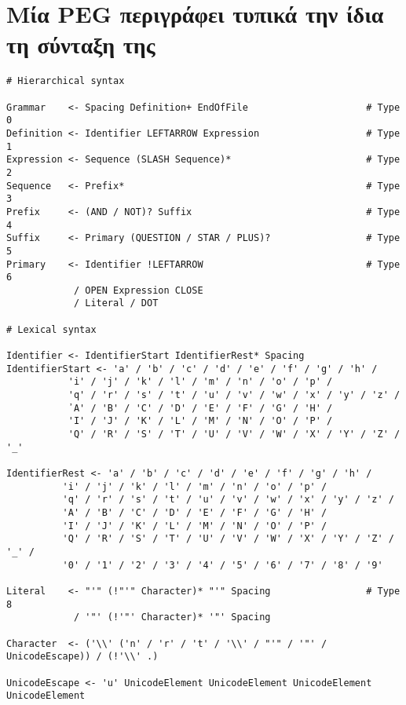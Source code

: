 \documentclass[diploma]{softlab-thesis}
\begin{document}

\backmatter

\appendix

\chapter{Μία PEG περιγράφει τυπικά την ίδια τη σύνταξη της}

\begin{Verbatim}
# Hierarchical syntax

Grammar    <- Spacing Definition+ EndOfFile                     # Type 0
Definition <- Identifier LEFTARROW Expression                   # Type 1
Expression <- Sequence (SLASH Sequence)*                        # Type 2
Sequence   <- Prefix*                                           # Type 3
Prefix     <- (AND / NOT)? Suffix                               # Type 4
Suffix     <- Primary (QUESTION / STAR / PLUS)?                 # Type 5
Primary    <- Identifier !LEFTARROW                             # Type 6
            / OPEN Expression CLOSE
            / Literal / DOT

# Lexical syntax

Identifier <- IdentifierStart IdentifierRest* Spacing
IdentifierStart <- 'a' / 'b' / 'c' / 'd' / 'e' / 'f' / 'g' / 'h' / 
		   'i' / 'j' / 'k' / 'l' / 'm' / 'n' / 'o' / 'p' / 
		   'q' / 'r' / 's' / 't' / 'u' / 'v' / 'w' / 'x' / 'y' / 'z' / 
		   ᾽A' / 'B' / 'C' / 'D' / 'E' / 'F' / 'G' / 'H' / 
		   'I' / 'J' / 'K' / 'L' / 'M' / 'N' / 'O' / 'P' / 
		   'Q' / 'R' / 'S' / 'T' / 'U' / 'V' / 'W' / 'X' / 'Y' / 'Z' / '_'

IdentifierRest <- 'a' / 'b' / 'c' / 'd' / 'e' / 'f' / 'g' / 'h' / 
		  'i' / 'j' / 'k' / 'l' / 'm' / 'n' / 'o' / 'p' / 
		  'q' / 'r' / 's' / 't' / 'u' / 'v' / 'w' / 'x' / 'y' / 'z' / 
		  'A' / 'B' / 'C' / 'D' / 'E' / 'F' / 'G' / 'H' / 
		  'I' / 'J' / 'K' / 'L' / 'M' / 'N' / 'O' / 'P' / 
		  'Q' / 'R' / 'S' / 'T' / 'U' / 'V' / 'W' / 'X' / 'Y' / 'Z' / '_' / 
		  '0' / '1' / '2' / '3' / '4' / '5' / '6' / '7' / '8' / '9'

Literal    <- "'" (!"'" Character)* "'" Spacing                 # Type 8
            / '"' (!'"' Character)* '"' Spacing

Character  <- ('\\' ('n' / 'r' / 't' / '\\' / "'" / '"' / UnicodeEscape)) / (!'\\' .)

UnicodeEscape <- 'u' UnicodeElement UnicodeElement UnicodeElement UnicodeElement


\end{Verbatim}
\end{document}
